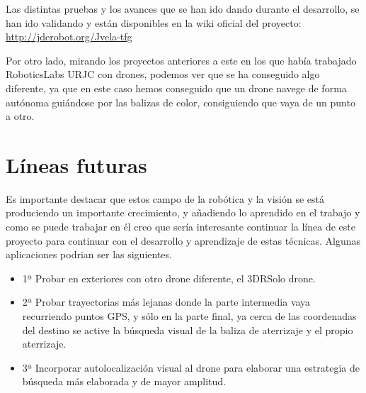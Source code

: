 \hspace{1cm} Las distintas pruebas y los avances que se han ido dando durante el desarrollo, se han ido validando y est\'an disponibles en la wiki oficial del proyecto:\\
\underline{\url{http://jderobot.org/Jvela-tfg}}

\hspace{1cm} Por otro lado, mirando los proyectos anteriores a este en los que hab\'ia trabajado RoboticsLabs URJC con drones, podemos ver que se ha conseguido algo diferente, ya que en este caso hemos conseguido que un drone navege de forma aut\'onoma gui\'andose por las balizas de color, consiguiendo que vaya de un punto a otro. 


\section{L\'ineas futuras}

\hspace{1cm}Es importante destacar que estos campo de la rob\'otica y la visi\'on se est\'a produciendo un importante crecimiento, y añadiendo lo aprendido en el trabajo y como se puede trabajar en \'el creo que ser\'ia interesante continuar la l\'inea de este proyecto para continuar con el desarrollo y aprendizaje de estas t\'ecnicas. Algunas aplicaciones podrian ser las siguientes.

\begin{itemize}
\item 1ª Probar en exteriores con otro drone diferente, el 3DRSolo drone.
\item 2ª Probar trayectorias m\'as lejanas donde la parte intermedia vaya recurriendo puntos GPS, y s\'olo en la parte final, ya cerca de las coordenadas del destino se active la b\'usqueda visual de la baliza de aterrizaje y el propio aterrizaje.
\item 3ª Incorporar autolocalizaci\'on visual al drone para elaborar una estrategia de b\'usqueda m\'as elaborada y de mayor amplitud.
\end{itemize}

